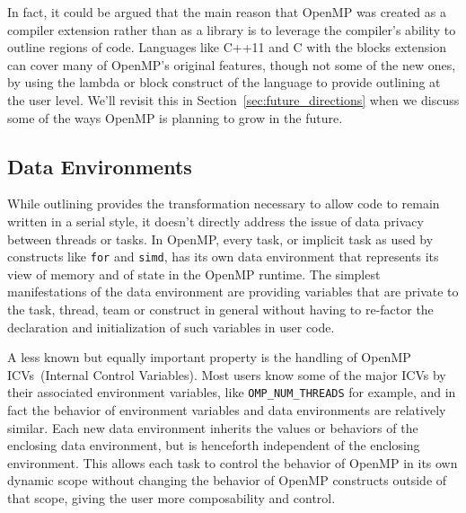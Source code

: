 In fact, it could be argued that the main reason that OpenMP was created as a
compiler extension rather than as a library is to leverage the compiler's
ability to outline regions of code.  Languages like C++11 and C with the blocks
extension can cover many of OpenMP's original features, though not some of the
new ones, by using the lambda or block construct of the language to provide
outlining at the user level.  We'll revisit this in
Section~\ref{sec:future_directions} when we discuss some of the ways OpenMP is
planning to grow in the future.

\subsection{Data Environments}
\label{sub:data_environments}

While outlining provides the transformation necessary to allow code to remain
written in a serial style, it doesn't directly address the issue of data privacy
between threads or tasks.  In OpenMP, every task, or implicit task as used by
constructs like \texttt{for} and \texttt{simd}, has its own data environment
that represents its view of memory and of state in the OpenMP runtime.  The
simplest manifestations of the data environment are providing variables that are
private to the task, thread, team or construct in general without having to
re-factor the declaration and initialization of such variables in user code.

A less known but equally important property is the handling of OpenMP
ICVs~(Internal Control Variables).  Most users know some of the major ICVs by
their associated environment variables, like \texttt{OMP\_NUM\_THREADS} for
example, and in fact the behavior of environment variables and data environments
are relatively similar.  Each new data environment inherits the values or
behaviors of the enclosing data environment, but is henceforth independent of
the enclosing environment.  This allows each task to control the behavior of
OpenMP in its own dynamic scope without changing the behavior of OpenMP
constructs outside of that scope, giving the user more composability and
control.

